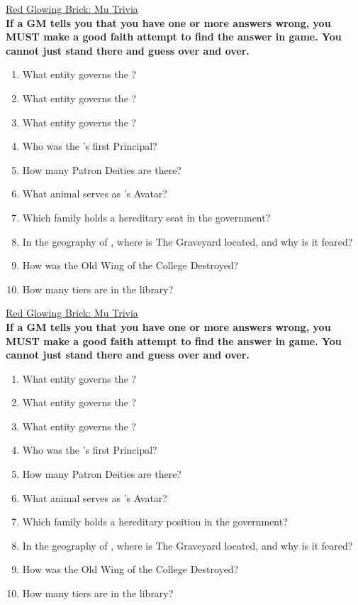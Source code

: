 \documentclass[white]{GL2020}
\begin{document}
\name{\wTriviaMu{}}

\vspace*{0.5cm}
\begin{center}
{\LARGE \underline{Red Glowing Brick: Mu Trivia}}\\
\vspace{0.5cm}
\textbf{If a GM tells you that you have one or more answers wrong, you MUST make a good faith attempt to find the answer in game. You cannot just stand there and guess over and over.}
\begin{multicols}{2}
\begin{enumerate}
	\item What entity governs the \pFarm{}?
	\item What entity governs the \pTech{}?
	\item What entity governs the \pShip{}?
	\item Who was the \pSchool{}’s first Principal?
	\item How many Patron Deities are there?
	\item What animal serves as \cFarmGod{}'s Avatar?
	\item Which family holds a hereditary seat in the \pTech{} government?
	\item In the geography of \pEarth{}, where is The Graveyard located, and why is it feared?
	\item How was the Old Wing of the College Destroyed?
	\item How many tiers are in the library?
\end{enumerate}
\end{multicols}

\vspace{8cm}
{\LARGE \underline{Red Glowing Brick: Mu Trivia}}\\
\vspace{0.5cm}
\textbf{If a GM tells you that you have one or more answers wrong, you MUST make a good faith attempt to find the answer in game. You cannot just stand there and guess over and over.}
\begin{multicols}{2}
\begin{enumerate}
	\item What entity governs the \pFarm{}?
	\item What entity governs the \pTech{}?
	\item What entity governs the \pShip{}?
	\item Who was the \pSchool{}’s first Principal?
	\item How many Patron Deities are there?
	\item What animal serves as \cFarmGod{}'s Avatar?
	\item Which family holds a hereditary position in the \pTech{} government?
	\item In the geography of \pEarth{}, where is The Graveyard located, and why is it feared?
	\item How was the Old Wing of the College Destroyed?
	\item How many tiers are in the library?
\end{enumerate}
\end{multicols}



\end{center}
\end{document}
